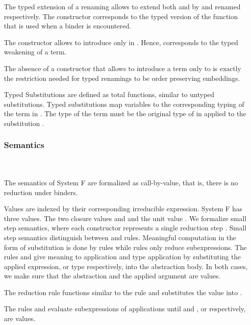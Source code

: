 \noindent The typed extension of a renaming  allows to extend both  and  by  and renamed  respectively. 
The constructor  corresponds to the typed version of the function  that is used when a binder is encountered. 

\noindent The constructor  allows to introduce  only in . 
Hence,  corresponds to the typed weakening  of a term.

\noindent The absence of a constructor that allows to introduce a term only to  is exactly the restriction needed for typed renamings to be order preserving embeddings.

\noindent Typed Substitutions are defined as total functions, similar to untyped substitutions.
\FSubTyping
Typed substitutions  map variables    to the corresponding typing of the term  in . 
The type of the term  must be the original type of  in  applied to the substitution .
\subsubsection{Semantics}\hfill\\\\
The semantics of System F are formalized as call-by-value, that is, there is no reduction under binders. 

\noindent Values are indexed by their corresponding irreducible expression.
\FVal
System F has three values. 
The two closure values  and  and the unit value .
We formalize small step semantics, where each constructor represents a single reduction step   .
Small step semantics distinguish between  and  rules. 
Meaningful computation in the form of substitution is done by  rules while  rules only reduce subexpressions.
\FSemantics
The rules  and  give meaning to application and type application by substituting the applied expression, or type respectively, into the abstraction body. 
In both cases, we make sure that the abstraction and the applied argument are values.

\noindent The reduction rule  functions similar to the rule  and substitutes the value  into . 

\noindent The rules  and  evaluate subexpressions of applications until  and , or  respectively, are values. 

